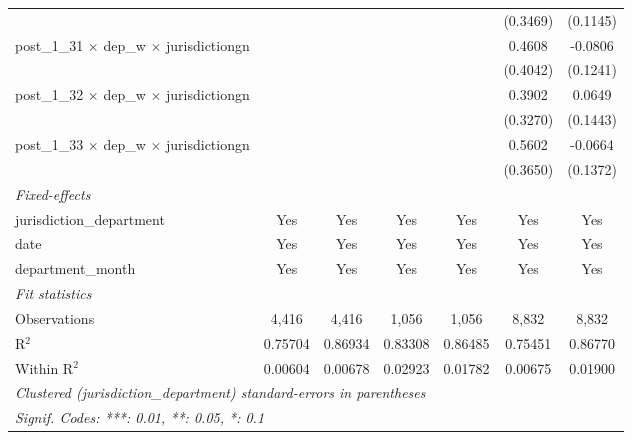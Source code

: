 \begin{tabular}{lcccccc}
                                                            &              &                     &              &                     & (0.3469)      & (0.1145)\\   
   post\_1\_31 $\times$ dep\_w $\times$ jurisdictiongn      &              &                     &              &                     & 0.4608        & -0.0806\\   
                                                            &              &                     &              &                     & (0.4042)      & (0.1241)\\   
   post\_1\_32 $\times$ dep\_w $\times$ jurisdictiongn      &              &                     &              &                     & 0.3902        & 0.0649\\   
                                                            &              &                     &              &                     & (0.3270)      & (0.1443)\\   
   post\_1\_33 $\times$ dep\_w $\times$ jurisdictiongn      &              &                     &              &                     & 0.5602        & -0.0664\\   
                                                            &              &                     &              &                     & (0.3650)      & (0.1372)\\   
   \midrule
   \emph{Fixed-effects}\\
   jurisdiction\_department                                 & Yes          & Yes                 & Yes          & Yes                 & Yes           & Yes\\  
   date                                                     & Yes          & Yes                 & Yes          & Yes                 & Yes           & Yes\\  
   department\_month                                        & Yes          & Yes                 & Yes          & Yes                 & Yes           & Yes\\  
   \midrule
   \emph{Fit statistics}\\
   Observations                                             & 4,416        & 4,416               & 1,056        & 1,056               & 8,832         & 8,832\\  
   R$^2$                                                    & 0.75704      & 0.86934             & 0.83308      & 0.86485             & 0.75451       & 0.86770\\  
   Within R$^2$                                             & 0.00604      & 0.00678             & 0.02923      & 0.01782             & 0.00675       & 0.01900\\  
   \midrule \midrule
   \multicolumn{7}{l}{\emph{Clustered (jurisdiction\_department) standard-errors in parentheses}}\\
   \multicolumn{7}{l}{\emph{Signif. Codes: ***: 0.01, **: 0.05, *: 0.1}}\\
\end{tabular}
\par\endgroup
